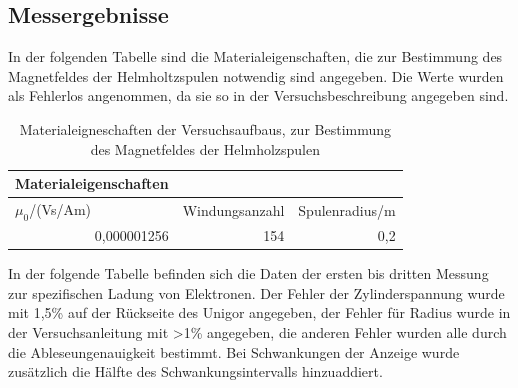 \documentclass[12pt,a4paper]{article}
\begin{document}
\subsection{Messergebnisse}

In der folgenden Tabelle sind die Materialeigenschaften, die zur Bestimmung des Magnetfeldes der Helmholtzspulen notwendig sind angegeben. Die Werte wurden als Fehlerlos angenommen, da sie so in der Versuchsbeschreibung angegeben sind.

\begin{table}[H]
\caption{Materialeigneschaften der Versuchsaufbaus, zur Bestimmung des Magnetfeldes der Helmholzspulen}
\begin{center}
\begin{tabular}{|l|l|l|}
\hline
Materialeigenschaften &  &  \\ \hline
$\mu_0$/(Vs/Am) & Windungsanzahl & Spulenradius/m \\ \hline
\multicolumn{1}{|r|}{0,000001256} & \multicolumn{1}{r|}{154} & \multicolumn{1}{r|}{0,2} \\ \hline
\end{tabular}
\end{center}
\label{tab:1_m}
\end{table}

In der folgende Tabelle befinden sich die Daten der ersten bis dritten Messung zur spezifischen Ladung von Elektronen. Der Fehler der Zylinderspannung wurde mit 1,5\% auf der Rückseite des Unigor angegeben, der Fehler für Radius wurde in der Versuchsanleitung mit >1\% angegeben, die anderen Fehler wurden alle durch die Ableseungenauigkeit bestimmt. Bei Schwankungen der Anzeige wurde zusätzlich die Hälfte des Schwankungsintervalls hinzuaddiert.
\end{document}
